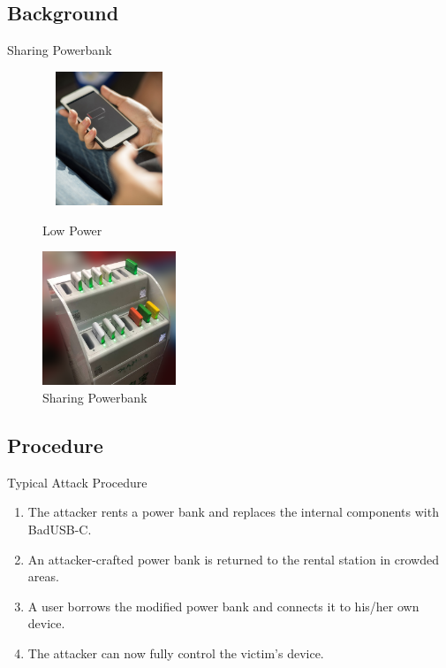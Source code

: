 \documentclass{beamer}
\begin{document}
\subsection{Background}
\begin{frame}{Sharing Powerbank}
	\begin{figure}[htbp]
		\centering
		\begin{minipage}[t]{0.4\textwidth}
			\centering
			\includegraphics[width=4cm, height=4cm]{Figs/low_power.png}
			\caption*{Low Power}
		\end{minipage}
		\begin{minipage}[t]{0.4\textwidth}
			\centering
			\includegraphics[width=4cm, height=4cm]{Figs/PBS_xd.png}
			\caption*{Sharing Powerbank}
		\end{minipage}
	\end{figure}
\end{frame}
\subsection{Procedure}
\begin{frame}{Typical Attack Procedure}
	\begin{enumerate}
		\item The attacker rents a power bank and replaces the internal components with BadUSB-C.
		\item An attacker-crafted power bank is returned to the rental station in crowded areas.
		\item A user borrows the modified power bank and connects it to his/her own device.
		\item The attacker can now fully control the victim's device.
	\end{enumerate}
\end{frame}
\end{document}
